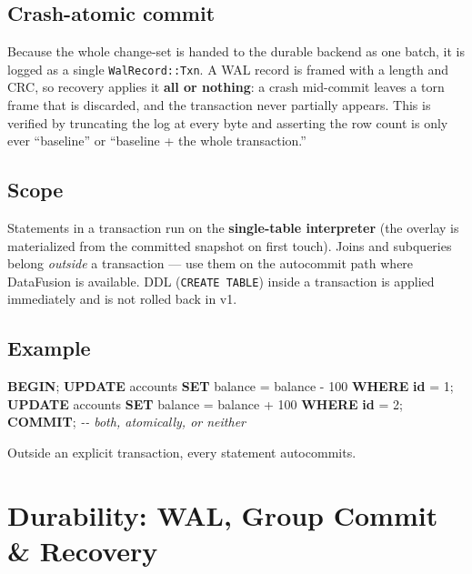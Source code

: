 \documentclass[
  11pt,
  openany]{book}
\newenvironment{Shaded}{}{}
\newcommand{\CommentTok}[1]{\textcolor[rgb]{0.38,0.63,0.69}{\textit{#1}}}
\newcommand{\ControlFlowTok}[1]{\textcolor[rgb]{0.00,0.44,0.13}{\textbf{#1}}}
\newcommand{\DecValTok}[1]{\textcolor[rgb]{0.25,0.63,0.44}{#1}}
\newcommand{\KeywordTok}[1]{\textcolor[rgb]{0.00,0.44,0.13}{\textbf{#1}}}
\newcommand{\NormalTok}[1]{#1}
\newcommand{\OperatorTok}[1]{\textcolor[rgb]{0.40,0.40,0.40}{#1}}
\begin{document}
\section{Crash-atomic commit}\label{crash-atomic-commit}

Because the whole change-set is handed to the durable backend as one
batch, it is logged as a single \texttt{WalRecord::Txn}. A WAL record is
framed with a length and CRC, so recovery applies it \textbf{all or
nothing}: a crash mid-commit leaves a torn frame that is discarded, and
the transaction never partially appears. This is verified by truncating
the log at every byte and asserting the row count is only ever
``baseline'' or ``baseline + the whole transaction.''

\section{Scope}\label{scope}

Statements in a transaction run on the \textbf{single-table interpreter}
(the overlay is materialized from the committed snapshot on first
touch). Joins and subqueries belong \emph{outside} a transaction --- use
them on the autocommit path where DataFusion is available. DDL
(\texttt{CREATE\ TABLE}) inside a transaction is applied immediately and
is not rolled back in v1.

\section{Example}\label{example}

\begin{Shaded}
\begin{Highlighting}[]
\ControlFlowTok{BEGIN}\NormalTok{;}
  \KeywordTok{UPDATE}\NormalTok{ accounts }\KeywordTok{SET}\NormalTok{ balance }\OperatorTok{=}\NormalTok{ balance }\OperatorTok{{-}} \DecValTok{100} \KeywordTok{WHERE} \KeywordTok{id} \OperatorTok{=} \DecValTok{1}\NormalTok{;}
  \KeywordTok{UPDATE}\NormalTok{ accounts }\KeywordTok{SET}\NormalTok{ balance }\OperatorTok{=}\NormalTok{ balance }\OperatorTok{+} \DecValTok{100} \KeywordTok{WHERE} \KeywordTok{id} \OperatorTok{=} \DecValTok{2}\NormalTok{;}
\KeywordTok{COMMIT}\NormalTok{;   }\CommentTok{{-}{-} both, atomically, or neither}
\end{Highlighting}
\end{Shaded}

Outside an explicit transaction, every statement autocommits.

\chapter{Durability: WAL, Group Commit \&
Recovery}\label{durability-wal-group-commit-recovery}
\end{document}
